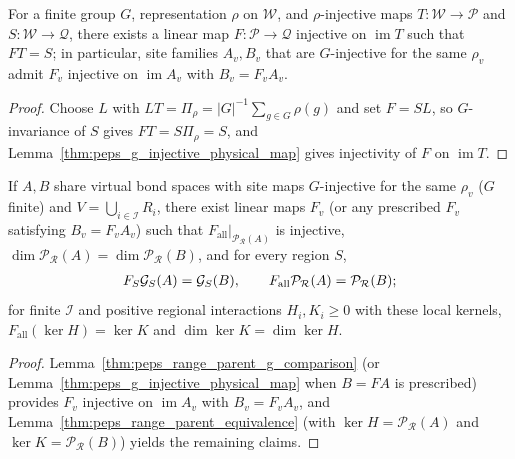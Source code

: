 \begin{lemma}%
    \label{thm:peps_range_parent_g_comparison}
    \leanok
    For a finite group $G$, representation $\rho$ on $\mathcal W$, and $\rho$-injective maps $T:\mathcal W\to\mathcal P$ and $S:\mathcal W\to\mathcal Q$, there exists a linear map $F:\mathcal P\to\mathcal Q$ injective on $\operatorname{im}T$ such that $FT=S$; in particular, site families $A_v,B_v$ that are $G$-injective for the same $\rho_v$ admit $F_v$ injective on $\operatorname{im}A_v$ with $B_v=F_vA_v$.
\end{lemma}
\begin{proof}\leanok
    Choose $L$ with $LT=\Pi_\rho=|G|^{-1}\sum_{g\in G}\rho(g)$ and set $F=SL$, so $G$-invariance of $S$ gives $FT=S\Pi_\rho=S$, and Lemma~\ref{thm:peps_g_injective_physical_map} gives injectivity of $F$ on $\operatorname{im}T$.
\end{proof}

\begin{lemma}%
    \label{thm:peps_range_parent_g_transport}
    \leanok
    If $A,B$ share virtual bond spaces with site maps $G$-injective for the same $\rho_v$ ($G$ finite) and $V=\bigcup_{i\in\mathcal I}R_i$, there exist linear maps $F_v$ (or any prescribed $F_v$ satisfying $B_v=F_vA_v$) such that $F_{\mathrm{all}}|_{\mathcal P_{\mathcal R}(A)}$ is injective, $\dim\mathcal P_{\mathcal R}(A)=\dim\mathcal P_{\mathcal R}(B)$, and for every region $S$,
    \begin{align}
        F_S\mathcal G_S(A) =\mathcal G_S(B), \qquad
        F_{\mathrm{all}}\mathcal P_{\mathcal R}(A) =\mathcal P_{\mathcal R}(B); \notag
    \end{align}
    for finite $\mathcal I$ and positive regional interactions $H_i,K_i\ge0$ with these local kernels, $F_{\mathrm{all}}(\ker H)=\ker K$ and $\dim\ker K=\dim\ker H$.
\end{lemma}
\begin{proof}\leanok
    Lemma~\ref{thm:peps_range_parent_g_comparison} (or Lemma~\ref{thm:peps_g_injective_physical_map} when $B=FA$ is prescribed) provides $F_v$ injective on $\operatorname{im}A_v$ with $B_v=F_vA_v$, and Lemma~\ref{thm:peps_range_parent_equivalence} (with $\ker H=\mathcal P_{\mathcal R}(A)$ and $\ker K=\mathcal P_{\mathcal R}(B)$) yields the remaining claims.
\end{proof}
